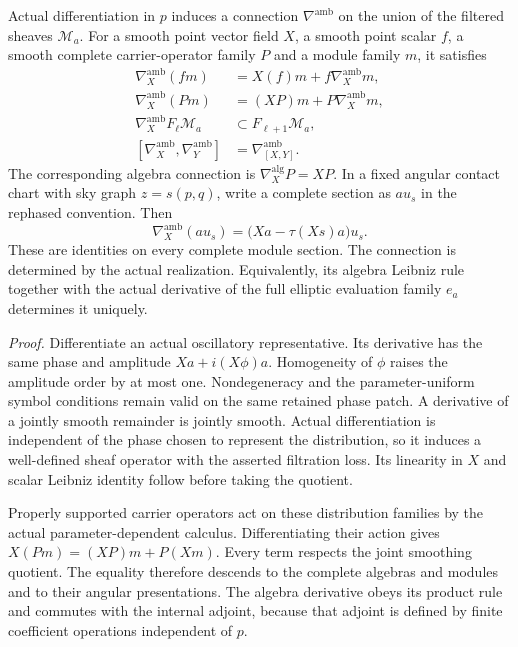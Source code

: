\documentclass[
  english,
  11pt,
  reqno]{amsart}
\begin{document}
Actual differentiation in \(p\) induces a connection
\(\nabla^{\mathrm{amb}}\) on the union of the filtered sheaves
\(\mathscr M_a\). For a smooth point vector field \(X\), a smooth point
scalar \(f\), a smooth complete carrier-operator family \(P\) and a
module family \(m\), it satisfies%
 \[
\begin{aligned}
\nabla_X^{\mathrm{amb}}(fm)
 &=X(f)m+f\nabla_X^{\mathrm{amb}}m,\\
\nabla_X^{\mathrm{amb}}(Pm)
 &=(XP)m+P\nabla_X^{\mathrm{amb}}m,\\
\nabla_X^{\mathrm{amb}}F_\ell\mathscr M_a
 &\subset F_{\ell+1}\mathscr M_a,\\
[\nabla_X^{\mathrm{amb}},\nabla_Y^{\mathrm{amb}}]
 &=\nabla_{[X,Y]}^{\mathrm{amb}}.
\end{aligned}
\] The corresponding algebra connection is
\(\nabla_X^{\mathrm{alg}}P=XP\). In a fixed angular contact chart with
sky graph \(z=s(p,q)\), write a complete section as \(a u_s\) in the
rephased convention. Then%
 \[
\nabla_X^{\mathrm{amb}}(a u_s)
=\bigl(Xa-\tau(Xs)a\bigr)u_s.
\] These are identities on every complete module section. The connection
is determined by the actual realization. Equivalently, its algebra
Leibniz rule together with the actual derivative of the full elliptic
evaluation family \(e_a\) determines it uniquely.

\emph{Proof.} Differentiate an actual oscillatory representative. Its
derivative has the same phase and amplitude \(Xa+i(X\phi)a\).
Homogeneity of \(\phi\) raises the amplitude order by at most one.
Nondegeneracy and the parameter-uniform symbol conditions remain valid
on the same retained phase patch. A derivative of a jointly smooth
remainder is jointly smooth. Actual differentiation is independent of
the phase chosen to represent the distribution, so it induces a
well-defined sheaf operator with the asserted filtration loss. Its
linearity in \(X\) and scalar Leibniz identity follow before taking the
quotient.

Properly supported carrier operators act on these distribution families
by the actual parameter-dependent calculus. Differentiating their action
gives \(X(Pm)=(XP)m+P(Xm)\). Every term respects the joint smoothing
quotient. The equality therefore descends to the complete algebras and
modules and to their angular presentations. The algebra derivative obeys
its product rule and commutes with the internal adjoint, because that
adjoint is defined by finite coefficient operations independent of
\(p\).
\end{document}
